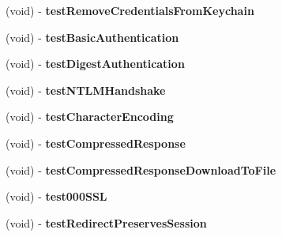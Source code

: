 \begin{DoxyCompactItemize}
\item 
\hypertarget{interface_a_s_i_h_t_t_p_request_tests_ab55f5b89f90f18669e5abe8219ea227d}{
(void) -\/ {\bfseries test\-Remove\-Credentials\-From\-Keychain}}
\label{interface_a_s_i_h_t_t_p_request_tests_ab55f5b89f90f18669e5abe8219ea227d}

\item 
\hypertarget{interface_a_s_i_h_t_t_p_request_tests_a95ec0edfa8e276c8e701b57e76d20c03}{
(void) -\/ {\bfseries test\-Basic\-Authentication}}
\label{interface_a_s_i_h_t_t_p_request_tests_a95ec0edfa8e276c8e701b57e76d20c03}

\item 
\hypertarget{interface_a_s_i_h_t_t_p_request_tests_a66b1d1d52e3faaadb334efa3ca93351e}{
(void) -\/ {\bfseries test\-Digest\-Authentication}}
\label{interface_a_s_i_h_t_t_p_request_tests_a66b1d1d52e3faaadb334efa3ca93351e}

\item 
\hypertarget{interface_a_s_i_h_t_t_p_request_tests_a42b76a1c974d5b1b8ff1a22a20381b06}{
(void) -\/ {\bfseries test\-N\-T\-L\-M\-Handshake}}
\label{interface_a_s_i_h_t_t_p_request_tests_a42b76a1c974d5b1b8ff1a22a20381b06}

\item 
\hypertarget{interface_a_s_i_h_t_t_p_request_tests_ae25e5af72786306a726678b3e50efa71}{
(void) -\/ {\bfseries test\-Character\-Encoding}}
\label{interface_a_s_i_h_t_t_p_request_tests_ae25e5af72786306a726678b3e50efa71}

\item 
\hypertarget{interface_a_s_i_h_t_t_p_request_tests_ae884e3724fa16e86e2c9f202fafb0832}{
(void) -\/ {\bfseries test\-Compressed\-Response}}
\label{interface_a_s_i_h_t_t_p_request_tests_ae884e3724fa16e86e2c9f202fafb0832}

\item 
\hypertarget{interface_a_s_i_h_t_t_p_request_tests_ad9fe5125c3c071c35369d0df17222250}{
(void) -\/ {\bfseries test\-Compressed\-Response\-Download\-To\-File}}
\label{interface_a_s_i_h_t_t_p_request_tests_ad9fe5125c3c071c35369d0df17222250}

\item 
\hypertarget{interface_a_s_i_h_t_t_p_request_tests_a91af84b41f3a46f64d16095adb340214}{
(void) -\/ {\bfseries test000\-S\-S\-L}}
\label{interface_a_s_i_h_t_t_p_request_tests_a91af84b41f3a46f64d16095adb340214}

\item 
\hypertarget{interface_a_s_i_h_t_t_p_request_tests_a3132c64a767dc4789eedb611544874b7}{
(void) -\/ {\bfseries test\-Redirect\-Preserves\-Session}}
\label{interface_a_s_i_h_t_t_p_request_tests_a3132c64a767dc4789eedb611544874b7}


\end{DoxyCompactItemize}
